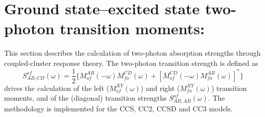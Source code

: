 
\section{Ground state--excited state two-photon transition moments:
} \label{sec:cctpa}

This section describes the calculation of 
two-photon absorption strengths 
through coupled-cluster response theory.
The two-photon transition strength is defined as
\[
S^{of}_{AB,CD}(\omega) = \frac{1}{2} \{ M^{AB}_{of}(-\omega) M^{CD}_{fo}(\omega)
                         +[M^{CD}_{of}(-\omega) M^{AB}_{fo}(\omega)]^\ast\}
\]
 drives the calculation of the left ($M^{XY}_{of}(\omega)$)
and right ($M^{XY}_{fo}(\omega)$) transition moments, and of the 
(diagonal) transition strengths $S^{of}_{AB,AB}(\omega)$.
The methodology is implemented for the CCS, CC2, CCSD and CC3 models.

\begin{center}
\end{center}

